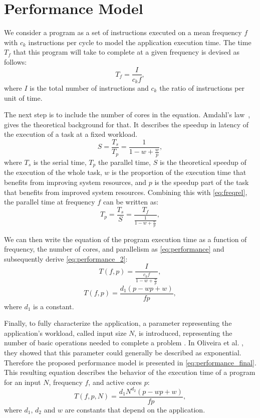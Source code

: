 \section{Performance Model} \label{sec:performance_model}
We consider a program as a set of instructions executed on a mean frequency $f$ with $c_k$ instructions per cycle to model the application execution time. The time $T_f$ that this program will take to complete at a given frequency is devised as follows:
\begin{equation}
	T_f=\frac{I}{c_kf},
	\label{eq:freqrel}
\end{equation}
where $I$ is the total number of instructions and $c_k$ the ratio of instructions per unit of time.

The next step is to include the number of cores in the equation. Amdahl's law~\cite{Amdahl1967ValidityCapabilities}, gives the theoretical background for that. It describes the speedup in latency of the execution of a task at a fixed workload.
\begin{equation}
	S=\frac{T_s}{T_p}=\frac{1}{1-w+\frac{w}{p}},
	\label{eq:amdahl}
\end{equation}
where $T_s$ is the serial time, $T_p$ the parallel time, $S$ is the theoretical speedup of the execution of the whole task, $w$ is the proportion of the execution time that benefits from improving system resources, and $p$ is the speedup part of the task that benefits from improved system resources. Combining this with \cref{eq:freqrel}, the parallel time at frequency $f$ can be written as:
\begin{equation}
	T_p=\frac{T_s}{S}=\frac{T_f}{\frac{1}{1-w+\frac{w}{p}}},
	\label{eq:parallel_time}
\end{equation}

We can then write the equation of the program execution time as a function of frequency, the number of cores, and parallelism  as \cref{eq:performance} and subsequently derive \cref{eq:performance_2}:
\begin{equation}
	T(f,p)=\frac{I}{ \frac{c_kf}{1-w+\frac{w}{p}} },
	\label{eq:performance}
\end{equation}
\begin{equation}
	T(f,p)=\frac{d_1(p-wp+w)}{fp},
	\label{eq:performance_2}
\end{equation}
where $d_1$ is a constant.

Finally, to fully characterize the application, a parameter representing the application's workload, called input size $N$, is introduced, representing the number of basic operations needed to complete a problem \cite{Kumar1994AnalyzingArchitectures}. In Oliveira et al. \cite{Oliveira2018ApplicationCharacterization}, they showed that this parameter could generally be described as exponential. Therefore the proposed performance model is presented in \cref{eq:performance_final}. This resulting equation describes the behavior of the execution time of a program for an input $N$, frequency $f$, and active cores $p$:
\begin{equation}
	T(f,p,N)=\frac{d_1N^{d_2}(p-wp+w)}{fp},
	\label{eq:performance_final}
\end{equation}
where $d_1$, $d_2$ and $w$ are constants that depend on the application.

